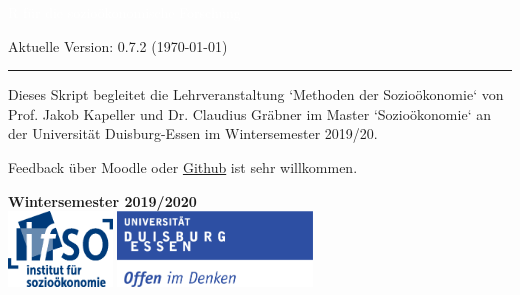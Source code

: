 \onehalfspacing
{}

\begin{titlepage}
\BgThispage
{}
\vspace*{2cm}
\noindent
\onehalfspacing
\textcolor{white}{\bigsf R für die \mbox{sozio\"okonomische} Forschung}
\vspace*{1.2cm}\par
Aktuelle Version: 0.7.2 (\today)\\
\vspace*{2.0cm}\par
\noindent
\begin{minipage}{0.35\linewidth}
    \begin{flushright}
        \printauthor
    \end{flushright}
\end{minipage} \hspace{15pt}
%
\begin{minipage}{0.02\linewidth}
    \rule{1pt}{175pt}
\end{minipage} \hspace{-10pt}
%
\begin{minipage}{0.6\linewidth}
\vspace{5pt}
\begin{adjustwidth}{25pt}{25pt}
\raggedright
Dieses Skript begleitet die Lehrveranstaltung `Methoden der Sozio\"okonomie` von
Prof. Jakob Kapeller und Dr. Claudius Gr\"abner im Master `Sozio\"okonomie` an der
Universit\"at Duisburg-Essen im Wintersemester 2019/20.

Feedback \"uber Moodle oder
\href{https://github.com/graebnerc/RforSocioEcon}{Github} ist
sehr willkommen.
\end{adjustwidth}

\end{minipage}

\vspace{0.25cm}
\centering
\vspace{1.25cm}
\textbf{Wintersemester 2019/2020}\\
\vfill
\includegraphics[height=2cm]{figures/ifso_logo_dt_RGB} \hspace{2cm}
\includegraphics[height=2cm]{figures/logo_ude.pdf}
\end{titlepage}

\newpage
{}

